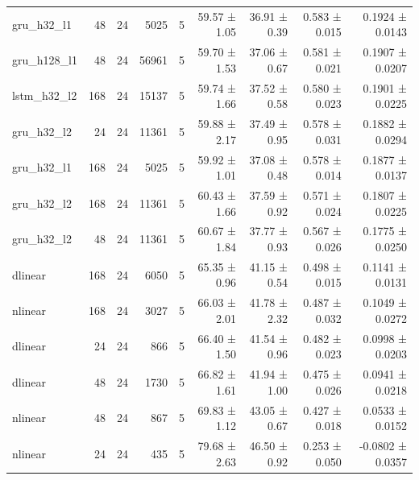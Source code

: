 \begin{table}[htbp]
\begin{tabular}{lrrrrrrrr}
gru\_h32\_l1 & 48 & 24 & 5025 & 5 & 59.57 ± 1.05 & 36.91 ± 0.39 & 0.583 ± 0.015 & 0.1924 ± 0.0143 \\
gru\_h128\_l1 & 48 & 24 & 56961 & 5 & 59.70 ± 1.53 & 37.06 ± 0.67 & 0.581 ± 0.021 & 0.1907 ± 0.0207 \\
lstm\_h32\_l2 & 168 & 24 & 15137 & 5 & 59.74 ± 1.66 & 37.52 ± 0.58 & 0.580 ± 0.023 & 0.1901 ± 0.0225 \\
gru\_h32\_l2 & 24 & 24 & 11361 & 5 & 59.88 ± 2.17 & 37.49 ± 0.95 & 0.578 ± 0.031 & 0.1882 ± 0.0294 \\
gru\_h32\_l1 & 168 & 24 & 5025 & 5 & 59.92 ± 1.01 & 37.08 ± 0.48 & 0.578 ± 0.014 & 0.1877 ± 0.0137 \\
gru\_h32\_l2 & 168 & 24 & 11361 & 5 & 60.43 ± 1.66 & 37.59 ± 0.92 & 0.571 ± 0.024 & 0.1807 ± 0.0225 \\
gru\_h32\_l2 & 48 & 24 & 11361 & 5 & 60.67 ± 1.84 & 37.77 ± 0.93 & 0.567 ± 0.026 & 0.1775 ± 0.0250 \\
dlinear & 168 & 24 & 6050 & 5 & 65.35 ± 0.96 & 41.15 ± 0.54 & 0.498 ± 0.015 & 0.1141 ± 0.0131 \\
nlinear & 168 & 24 & 3027 & 5 & 66.03 ± 2.01 & 41.78 ± 2.32 & 0.487 ± 0.032 & 0.1049 ± 0.0272 \\
dlinear & 24 & 24 & 866 & 5 & 66.40 ± 1.50 & 41.54 ± 0.96 & 0.482 ± 0.023 & 0.0998 ± 0.0203 \\
dlinear & 48 & 24 & 1730 & 5 & 66.82 ± 1.61 & 41.94 ± 1.00 & 0.475 ± 0.026 & 0.0941 ± 0.0218 \\
nlinear & 48 & 24 & 867 & 5 & 69.83 ± 1.12 & 43.05 ± 0.67 & 0.427 ± 0.018 & 0.0533 ± 0.0152 \\
nlinear & 24 & 24 & 435 & 5 & 79.68 ± 2.63 & 46.50 ± 0.92 & 0.253 ± 0.050 & -0.0802 ± 0.0357 \\
\bottomrule
\end{tabular}
\end{table}
